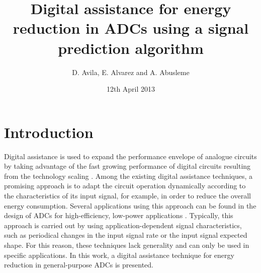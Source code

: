 \documentclass[twocolumn]{el-author}
\date{12th April 2013}
\begin{document}
\title{Digital assistance for energy reduction in ADCs using a signal prediction algorithm}

\author{D. Avila, E. Alvarez and A. Abusleme}


\maketitle

\section{Introduction}

Digital assistance is used to expand the performance envelope of analogue circuits by taking advantage of the fast growing performance of digital circuits resulting from the technology scaling \cite{1}. Among the existing digital assistance techniques, a promising approach is to adapt the circuit operation dynamically according to the characteristics of its input signal, for example, in order to reduce the overall energy consumption. Several applications using this approach can be found in the design of ADCs for \mbox{high-efficiency}, \mbox{low-power} applications \cite{3,4,5,6}. Typically, this approach is carried out by using \mbox{application-dependent} signal characteristics, such as periodical changes in the input signal rate or the input signal expected shape. For this reason, these techniques lack generality and can only be used in specific applications. In this work, a digital assistance technique for energy reduction in \mbox{general-purpose} ADCs is presented. 
\end{document}
